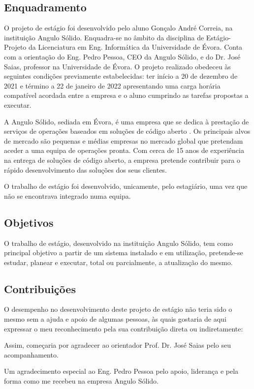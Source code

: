 \documentclass{article}
\begin{document}
\subsection{Enquadramento}
O projeto de estágio foi desenvolvido pelo aluno Gonçalo André Correia, na instituição Angulo Sólido. Enquadra-se no âmbito da disciplina de Estágio-Projeto da Licenciatura em Eng. Informática da Universidade de Évora. Conta com a orientação do Eng. Pedro Pessoa, CEO da Angulo Sólido, e do Dr. José Saias, professor na Universidade de Évora. O projeto realizado obedeceu às seguintes condições previamente estabelecidas: ter início a 20 de dezembro de 2021 e término a 22 de janeiro de 2022 apresentando uma carga horária compatível acordada entre a empresa e o aluno cumprindo as tarefas propostas a executar.

A Angulo Sólido, sediada em Évora, é uma empresa que se dedica à prestação de serviços de operações baseados em soluções de código aberto \cite{opensource}. Os principais alvos de mercado são pequenas e médias empresas no mercado global que pretendam aceder a uma equipa de operações pronta. Com cerca de 15 anos de experiência na entrega de soluções de código aberto, a empresa pretende contribuir para o rápido desenvolvimento das soluções dos seus clientes.

O trabalho de estágio foi desenvolvido, unicamente, pelo estagiário, uma vez que não se encontrava integrado numa equipa.

\subsection{Objetivos}
O trabalho de estágio, desenvolvido na instituição Angulo Sólido, tem como principal objetivo a partir de um sistema instalado e em utilização, pretende-se estudar, planear e executar, total ou parcialmente, a atualização do mesmo.

\subsection{Contribuições}
O desempenho no desenvolvimento deste projeto de estágio não teria sido o mesmo sem a ajuda e apoio de algumas pessoas, às quais gostaria de aqui expressar o meu reconhecimento pela sua contribuição direta ou indiretamente:

Assim, começaria por agradecer ao orientador Prof. Dr. José Saias pelo seu acompanhamento.

Um agradecimento especial ao Eng. Pedro Pessoa pelo apoio, liderança e pela forma como me recebeu na empresa Angulo Sólido. 
\end{document}
